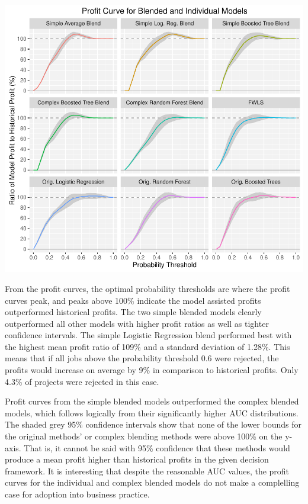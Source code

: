 \documentclass[]{elsarticle} %
\makeatletter
\def\maxwidth{\ifdim\Gin@nat@width>\linewidth\linewidth
\else\Gin@nat@width\fi}
\let\Oldincludegraphics\includegraphics
\renewcommand{\includegraphics}[1]{\Oldincludegraphics[width=\maxwidth]{#1}}
\makeatother
\begin{document}
\includegraphics{Consulting_Profitability_Paper_files/figure-latex/profit_curve-1.pdf}

From the profit curves, the optimal probability thresholds are where the
profit curves peak, and peaks above 100\% indicate the model assisted
profits outperformed historical profits. The two simple blended models
clearly outperformed all other models with higher profit ratios as well
as tighter confidence intervals. The simple Logistic Regression blend
performed best with the highest mean profit ratio of 109\% and a
standard deviation of 1.28\%. This means that if all jobs above the
probability threshold 0.6 were rejected, the profits would increase on
average by 9\% in comparison to historical profits. Only 4.3\% of
projects were rejected in this case.

Profit curves from the simple blended models outperformed the complex
blended models, which follows logically from their significantly higher
AUC distributions. The shaded grey 95\% confidence intervals show that
none of the lower bounds for the original methods' or complex blending
methods were above 100\% on the y-axis. That is, it cannot be said with
95\% confidence that these methods would produce a mean profit higher
than historical profits in the given decision framework. It is
interesting that despite the reasonable AUC values, the profit curves
for the individual and complex blended models do not make a complelling
case for adoption into business practice.
\end{document}
